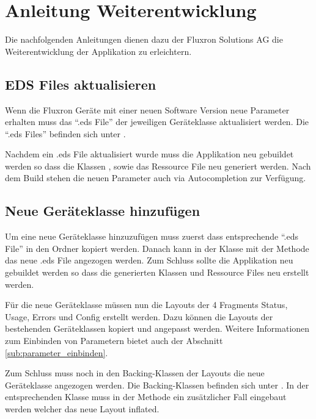 \section{Anleitung Weiterentwicklung}
\label{anleitung_weiterentwicklung}

Die nachfolgenden Anleitungen dienen dazu der Fluxron Solutions AG die Weiterentwicklung der Applikation zu erleichtern.

\subsection{EDS Files aktualisieren}
Wenn die Fluxron Geräte mit einer neuen Software Version neue Parameter erhalten muss das \enquote{.eds File} der jeweiligen Geräteklasse aktualisiert werden.
Die \enquote{.eds Files} befinden sich unter .

Nachdem ein .eds File aktualisiert wurde muss die Applikation neu gebuildet werden so dass die Klassen ,  sowie das Ressource File  neu generiert werden. Nach dem Build stehen die neuen Parameter auch via Autocompletion zur Verfügung.

\subsection{Neue Geräteklasse hinzufügen}
Um eine neue Geräteklasse hinzuzufügen muss zuerst dass entsprechende \enquote{.eds File} in den Ordner  kopiert werden. Danach kann in der Klasse  mit der Methode  das neue .eds File angezogen werden. Zum Schluss sollte die Applikation neu gebuildet werden so dass die generierten Klassen und Ressource Files neu erstellt werden.

Für die neue Geräteklasse müssen nun die Layouts der 4 Fragments Status, Usage, Errors und Config erstellt werden. Dazu können die Layouts der bestehenden Geräteklassen kopiert und angepasst werden. Weitere Informationen zum Einbinden von Parametern bietet auch der Abschnitt \ref{sub:parameter_einbinden}.

Zum Schluss muss noch in den Backing-Klassen der Layouts die neue Geräteklasse angezogen werden. Die Backing-Klassen befinden sich unter  . In der entsprechenden Klasse muss in der Methode  ein zusätzlicher Fall eingebaut werden welcher das neue Layout inflated.

